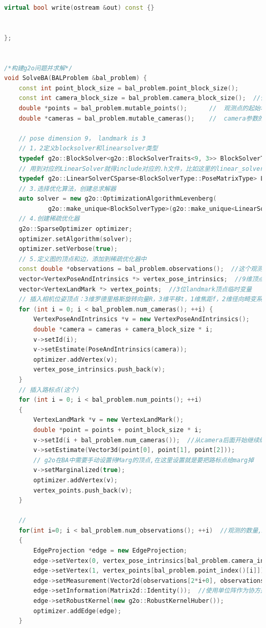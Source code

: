\documentclass[40pt,a4paper，UTF8]{ctexart}
\numberwithin{equation}{section}
\begin{document}
\begin{lstlisting}[language=C++, caption=BAL\_g2o核心代码]
    virtual bool write(ostream &out) const {}


};


/*构建g2o问题并求解*/
void SolveBA(BALProblem &bal_problem) {
    const int point_block_size = bal_problem.point_block_size();
    const int camera_block_size = bal_problem.camera_block_size();  //位姿，内参，畸变系数
    double *points = bal_problem.mutable_points();      //  观测点的起始地址
    double *cameras = bal_problem.mutable_cameras();    //  camera参数的起始地址

    // pose dimension 9， landmark is 3
    // 1，2定义blocksolver和linearsolver类型
    typedef g2o::BlockSolver<g2o::BlockSolverTraits<9, 3>> BlockSolverType;
    // 用到对应的LinearSolver就得include对应的.h文件，比如这里的linear_solver_csparse,h
    typedef g2o::LinearSolverCSparse<BlockSolverType::PoseMatrixType> LinearSolverType;
    // 3.选择优化算法，创建总求解器
    auto solver = new g2o::OptimizationAlgorithmLevenberg(
            g2o::make_unique<BlockSolverType>(g2o::make_unique<LinearSolverType>()));
    // 4.创建稀疏优化器
    g2o::SparseOptimizer optimizer;
    optimizer.setAlgorithm(solver);
    optimizer.setVerbose(true);
    // 5.定义图的顶点和边，添加到稀疏优化器中
    const double *observations = bal_problem.observations();  //这个观测值就是前面的4维数据<camera_index_1> <point_index_1> <x_1> <y_1>
    vector<VertexPoseAndIntrinsics *> vertex_pose_intrinsics;  //9维顶点临时变量
    vector<VertexLandMark *> vertex_points;  //3位landmark顶点临时变量
    // 插入相机位姿顶点：3维罗德里格斯旋转向量R，3维平移t，1维焦距f，2维径向畸变系数
    for (int i = 0; i < bal_problem.num_cameras(); ++i) {
        VertexPoseAndIntrinsics *v = new VertexPoseAndIntrinsics();
        double *camera = cameras + camera_block_size * i;
        v->setId(i);
        v->setEstimate(PoseAndIntrinsics(camera));
        optimizer.addVertex(v);
        vertex_pose_intrinsics.push_back(v);
    }
    // 插入路标点(这个)
    for (int i = 0; i < bal_problem.num_points(); ++i)
    {
        VertexLandMark *v = new VertexLandMark();
        double *point = points + point_block_size * i;
        v->setId(i + bal_problem.num_cameras());  //从camera后面开始继续编号
        v->setEstimate(Vector3d(point[0], point[1], point[2]));
        // g2o在BA中需要手动设置待Marg的顶点,在这里设置就是要把路标点给marg掉
        v->setMarginalized(true);
        optimizer.addVertex(v);
        vertex_points.push_back(v);
    }

    //
    for(int i=0; i < bal_problem.num_observations(); ++i)  //观测的数量,2个值算一组观测，所以取值的时候2*i
    {
        EdgeProjection *edge = new EdgeProjection;
        edge->setVertex(0, vertex_pose_intrinsics[bal_problem.camera_index()[i]]);
        edge->setVertex(1, vertex_points[bal_problem.point_index()[i]]);
        edge->setMeasurement(Vector2d(observations[2*i+0], observations[2*i+1]));
        edge->setInformation(Matrix2d::Identity());  //使用单位阵作为协方差矩阵
        edge->setRobustKernel(new g2o::RobustKernelHuber());
        optimizer.addEdge(edge);
    }


\end{lstlisting}
\end{document}
